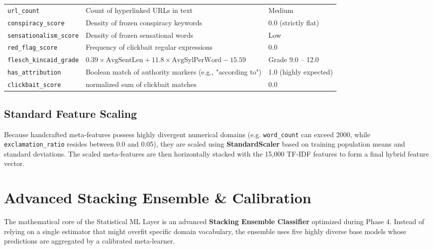 \documentclass[11pt,a4paper,oneside]{article}
\begin{document}
\begin{table}[h]
\begin{tabularx}{\textwidth}{lXl}
        \texttt{url\_count} & Count of hyperlinked URLs in text & Medium \\
        \rowcolor{lightbg} \texttt{conspiracy\_score} & Density of frozen conspiracy keywords & 0.0 (strictly flat) \\
        \texttt{sensationalism\_score}& Density of frozen sensational words & Low \\
        \rowcolor{lightbg} \texttt{red\_flag\_score} & Frequency of clickbait regular expressions & 0.0 \\
        \texttt{flesch\_kincaid\_grade} & $0.39 \times \text{AvgSentLen} + 11.8 \times \text{AvgSylPerWord} - 15.59$ & Grade 9.0 -- 12.0 \\
        \rowcolor{lightbg} \texttt{has\_attribution} & Boolean match of authority markers (e.g., "according to") & 1.0 (highly expected) \\
        \texttt{clickbait\_score} & normalized sum of clickbait matches & 0.0 \\
        \bottomrule
    \end{tabularx}
\end{table}

\subsection{Standard Feature Scaling}
Because handcrafted meta-features possess highly divergent numerical domains (e.g. \texttt{word\_count} can exceed 2000, while \texttt{exclamation\_ratio} resides between 0.0 and 0.05), they are scaled using \textbf{StandardScaler} based on training population means and standard deviations. The scaled meta-features are then horizontally stacked with the 15,000 TF-IDF features to form a final hybrid feature vector.

\newpage
\section{Advanced Stacking Ensemble \& Calibration}
\label{sec:ensemble}

The mathematical core of the Statistical ML Layer is an advanced \textbf{Stacking Ensemble Classifier} optimized during Phase 4. Instead of relying on a single estimator that might overfit specific domain vocabulary, the ensemble uses five highly diverse base models whose predictions are aggregated by a calibrated meta-learner.
\end{document}
